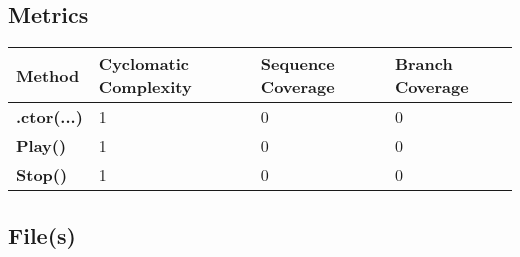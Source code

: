\documentclass[a4paper,10pt]{article}
\begin{document}
\subsection{Metrics}
\begin{longtable}[l]{|l|l|l|l|}
\hline
\textbf{Method} & \textbf{Cyclomatic Complexity} & \textbf{Sequence Coverage} & \textbf{Branch Coverage}\\
\hline
\textbf{.ctor(...)} & 1 & 0 & 0\\
\hline
\textbf{Play()} & 1 & 0 & 0\\
\hline
\textbf{Stop()} & 1 & 0 & 0\\
\hline
\end{longtable}
\subsection{File(s)}
\end{document}
